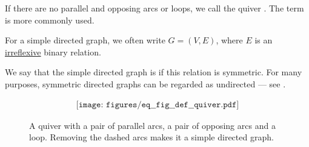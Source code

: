 \begin{definition}
\begin{thmenum}
     If there are no parallel and opposing arcs or loops, we call the quiver . The term  is more commonly used.

    For a simple directed graph, we often write \( G = (V, E) \), where \( E \) is an \hyperref[def:binary_relation/irreflexive]{irreflexive} binary relation.

    We say that the simple directed graph is  if this relation is symmetric. For many purposes, symmetric directed graphs can be regarded as undirected --- see .
  \end{thmenum}

  \begin{figure}
    \begin{equation}\label{eq:fig:def:quiver}
      \begin{aligned}
        \texttt{[image: figures/eq\_\_fig\_\_def\_\_quiver.pdf]}
      \end{aligned}
    \end{equation}
    \caption{A quiver with a pair of parallel arcs, a pair of opposing arcs and a loop. Removing the dashed arcs makes it a simple directed graph.}\label{fig:def:quiver}
  \end{figure}
\end{definition}

